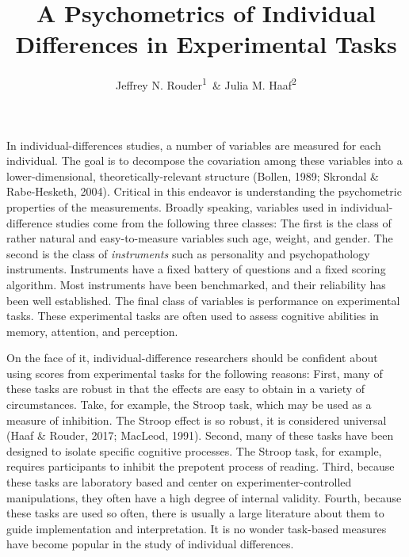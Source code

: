 \documentclass[english,man]{apa6}
\title{A Psychometrics of Individual Differences in Experimental Tasks}
\author{Jeffrey N. Rouder\textsuperscript{1}~\& Julia M. Haaf\textsuperscript{2}}
\affiliation{
    \vspace{0.5cm}
          \textsuperscript{1} University of California, Irvine\\
          \textsuperscript{2} University of Missouri  }
\theoremstyle{definition}
\theoremstyle{definition}
\theoremstyle{definition}
\theoremstyle{remark}
\begin{document}
\maketitle

\setcounter{secnumdepth}{0}



In individual-differences studies, a number of variables are measured
for each individual. The goal is to decompose the covariation among
these variables into a lower-dimensional, theoretically-relevant
structure (Bollen, 1989; Skrondal \& Rabe-Hesketh, 2004). Critical in
this endeavor is understanding the psychometric properties of the
measurements. Broadly speaking, variables used in individual-difference
studies come from the following three classes: The first is the class of
rather natural and easy-to-measure variables such age, weight, and
gender. The second is the class of \emph{instruments} such as
personality and psychopathology instruments. Instruments have a fixed
battery of questions and a fixed scoring algorithm. Most instruments
have been benchmarked, and their reliability has been well established.
The final class of variables is performance on experimental tasks. These
experimental tasks are often used to assess cognitive abilities in
memory, attention, and perception.

On the face of it, individual-difference researchers should be confident
about using scores from experimental tasks for the following reasons:
First, many of these tasks are robust in that the effects are easy to
obtain in a variety of circumstances. Take, for example, the Stroop
task, which may be used as a measure of inhibition. The Stroop effect is
so robust, it is considered universal (Haaf \& Rouder, 2017; MacLeod,
1991). Second, many of these tasks have been designed to isolate
specific cognitive processes. The Stroop task, for example, requires
participants to inhibit the prepotent process of reading. Third, because
these tasks are laboratory based and center on experimenter-controlled
manipulations, they often have a high degree of internal validity.
Fourth, because these tasks are used so often, there is usually a large
literature about them to guide implementation and interpretation. It is
no wonder task-based measures have become popular in the study of
individual differences.
\end{document}
